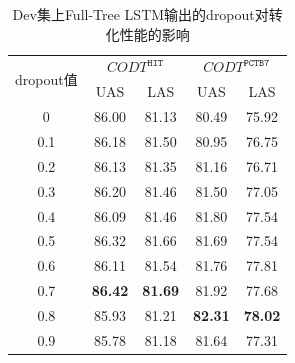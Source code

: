 \begin{table}[hb!]
    \addtolength{\tabcolsep}{+1.0mm}
    \centering
    \caption{Dev集上Full-Tree LSTM输出的dropout对转化性能的影响}
    \label{tb:Dev-dropout-results}
    \begin{tabular}{c cc cc}
        \toprule
        \multirow{2}{*}{dropout值} & \multicolumn{2}{c}{$CODT^{\texttt{HIT}}$} & \multicolumn{2}{c}{$CODT^{\texttt{PCTB7}}$}                                   \\
        \cmidrule(lr){2-3}
        \cmidrule(lr){4-5}
                                   & UAS                                       & LAS                                         & UAS            & LAS            \\
        \midrule
        0                          & 86.00                                     & 81.13                                       & 80.49          & 75.92          \\
        0.1                        & 86.18                                     & 81.50                                       & 80.95          & 76.75          \\
        0.2                        & 86.13                                     & 81.35                                       & 81.16          & 76.71          \\
        0.3                        & 86.20                                     & 81.46                                       & 81.50          & 77.05          \\
        0.4                        & 86.09                                     & 81.46                                       & 81.80          & 77.54          \\
        0.5                        & 86.32                                     & 81.66                                       & 81.69          & 77.54          \\
        0.6                        & 86.11                                     & 81.54                                       & 81.76          & 77.81          \\
        0.7                        & \textbf{86.42}                            & \textbf{81.69}                              & 81.92          & 77.68          \\
        0.8                        & 85.93                                     & 81.21                                       & \textbf{82.31} & \textbf{78.02} \\
        0.9                        & 85.78                                     & 81.18                                       & 81.64          & 77.31          \\
        \bottomrule
    \end{tabular}
\end{table}

